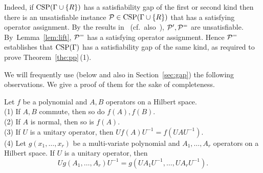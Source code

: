 Indeed, if ${\rm CSP}(\Gamma\cup\{R\})$ has a satisfiability gap of the first or second kind then there is an unsatisfiable instance ${\mathcal P}\in{\rm CSP}(\Gamma\cup\{R\})$ that has a satisfying operator assignment. By the results in~\cite{Bulatov05:classifying} (cf.~also~\cite{BKW17}), ${\mathcal P}',{\mathcal P}^=$ are unsatisfiable. By~Lemma~\ref{lem:lift}, ${\mathcal P}^=$ has a satisfying operator assignment. Hence ${\mathcal P}^=$ establishes that ${\rm CSP}(\Gamma)$ has a satisfiability gap of the same kind, as required to prove Theorem~\ref{the:pp}\,(1).

We will frequently use (below and also in Section~\ref{sec:gap}) the following observations. We give a proof of them for the sake of completeness.

\begin{lemma}\label{lem:matrix-polys}
Let $f$ be a polynomial and $A,B$ operators on a Hilbert space.\\[2mm]
(1) If $A,B$ commute, then so do $f(A),f(B)$.\\
(2) If $A$ is normal, then so is $f(A)$.\\
(3) If $U$ is a unitary operator, then $Uf(A)U^{-1}=f(UAU^{-1})$.\\[1mm]
(4) Let $g(x_1,\dots,x_r)$ be a multi-variate polynomial and $A_1,\dots,A_r$
  operators on a Hilbert space. If $U$ is a unitary operator, then 
\[
Ug(A_1,\dots,A_r)U^{-1}=g(UA_1U^{-1},\dots,UA_rU^{-1}).
\]
\end{lemma}

